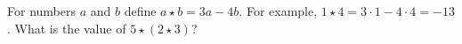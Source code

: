 For numbers $a$ and $b$ define $a\star b=3a-4b$. For example, $1\star4=3\cdot1-4\cdot4=-13$. What is the value of $5\star(2\star3)$?
